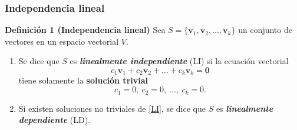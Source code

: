 \begin{frame}\frametitle{Independencia lineal}

\begin{block}{\textbf{Definición 1 (Independencia lineal)}}
\justifying
Sea $S=\{\mathbf{v}_1,\mathbf{v}_2,\hdots,\mathbf{v}_k\}$ un conjunto de vectores
en un espacio vectorial $V$.

\begin{enumerate}%
	\item[\labelname{$a$}] Se dice que $S$ es \textbf{\textit{linealmente independiente}} (LI) si
	la ecuación vectorial
	\begin{equation}\label{LI}
	c_1\mathbf{v}_1+c_2\mathbf{v}_2+\hdots+c_k\mathbf{v}_k = \mathbf{0}
	\end{equation}
	tiene solamente la \textbf{solución trivial}
	\[
	c_1 =0,\ c_2 =0,\ \hdots,\ c_k=0.
	\]
	
	\item[\labelname{$b$}] Si existen soluciones no triviales de \eqref{LI}, se dice que $S$ es \textbf{\textit{linealmente dependiente}} (LD).
\end{enumerate}		
\end{block}

\end{frame}


\subsection{}

